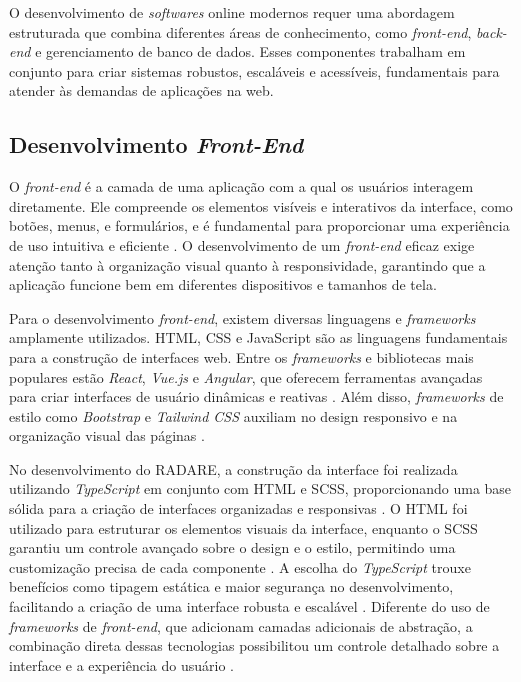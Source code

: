 O desenvolvimento de \textit{softwares} online modernos requer uma abordagem estruturada que combina diferentes áreas de conhecimento, como \textit{front-end}, \textit{back-end} e gerenciamento de banco de dados. Esses componentes trabalham em conjunto para criar sistemas robustos, escaláveis e acessíveis, fundamentais para atender às demandas de aplicações na web.

\subsection{Desenvolvimento \textit{Front-End}}

O \textit{front-end} é a camada de uma aplicação com a qual os usuários interagem diretamente. Ele compreende os elementos visíveis e interativos da interface, como botões, menus, e formulários, e é fundamental para proporcionar uma experiência de uso intuitiva e eficiente \cite{frontendrole}. O desenvolvimento de um \textit{front-end} eficaz exige atenção tanto à organização visual quanto à responsividade, garantindo que a aplicação funcione bem em diferentes dispositivos e tamanhos de tela.

Para o desenvolvimento \textit{front-end}, existem diversas linguagens e \textit{frameworks} amplamente utilizados. HTML, CSS e JavaScript são as linguagens fundamentais para a construção de interfaces web. Entre os \textit{frameworks} e bibliotecas mais populares estão \textit{React}, \textit{Vue.js} e \textit{Angular}, que oferecem ferramentas avançadas para criar interfaces de usuário dinâmicas e reativas \cite{reactbook}. Além disso, \textit{frameworks} de estilo como \textit{Bootstrap} e \textit{Tailwind CSS} auxiliam no design responsivo e na organização visual das páginas \cite{bootstrapdoc}.

No desenvolvimento do RADARE, a construção da interface foi realizada utilizando \textit{TypeScript} em conjunto com HTML e SCSS, proporcionando uma base sólida para a criação de interfaces organizadas e responsivas \cite{typescriptbook}. O HTML foi utilizado para estruturar os elementos visuais da interface, enquanto o SCSS garantiu um controle avançado sobre o design e o estilo, permitindo uma customização precisa de cada componente \cite{htmlcssbook}. A escolha do \textit{TypeScript} trouxe benefícios como tipagem estática e maior segurança no desenvolvimento, facilitando a criação de uma interface robusta e escalável \cite{typescriptsecurity}. Diferente do uso de \textit{frameworks} de \textit{front-end}, que adicionam camadas adicionais de abstração, a combinação direta dessas tecnologias possibilitou um controle detalhado sobre a interface e a experiência do usuário \cite{frontendwithoutframework}.

